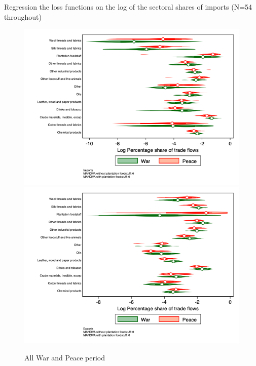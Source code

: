 \documentclass[12pt,a4paper,notitlepage,english]{article}
\begin{document}
\begin{table}
	\caption{Regression the loss functions on the log of the sectoral shares of imports (N=54 throughout)}
	
\end{table}





%

\begin{figure}
\caption{All War and Peace period}
\label{peace_war_nat_distr_sitc}
\includegraphics[scale=.4]{peace_war_nat_distr_Isitc}
\includegraphics[scale=.4]{peace_war_nat_distr_Xsitc}
\end{figure}
\end{document}
